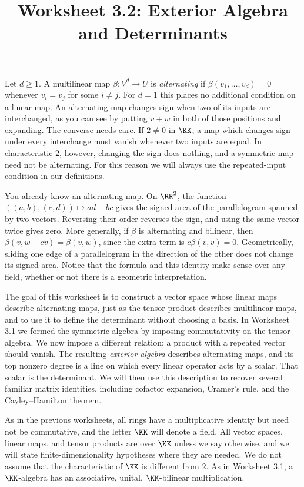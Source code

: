 \documentclass[12pt,reqno]{amsart}
\title{Worksheet 3.2: Exterior Algebra and Determinants}
\begin{document}
\maketitle
\thispagestyle{firstpage}

Let $d\geq1$. A multilinear map $\beta:V^d\to U$ is \emph{alternating} if $\beta(v_1,\ldots,v_d)=0$ whenever $v_i=v_j$ for some $i\ne j$. For $d=1$ this places no additional condition on a linear map. An alternating map changes sign when two of its inputs are interchanged, as you can see by putting $v+w$ in both of those positions and expanding. The converse needs care. If $2\ne0$ in $\KK$, a map which changes sign under every interchange must vanish whenever two inputs are equal. In characteristic $2$, however, changing the sign does nothing, and a symmetric map need not be alternating. For this reason we will always use the repeated-input condition in our definitions.

You already know an alternating map. On $\RR^2$, the function $((a,b),(c,d))\mapsto ad-bc$ gives the signed area of the parallelogram spanned by two vectors. Reversing their order reverses the sign, and using the same vector twice gives zero. More generally, if $\beta$ is alternating and bilinear, then $\beta(v,w+cv)=\beta(v,w)$, since the extra term is $c\beta(v,v)=0$. Geometrically, sliding one edge of a parallelogram in the direction of the other does not change its signed area. Notice that the formula and this identity make sense over any field, whether or not there is a geometric interpretation.

The goal of this worksheet is to construct a vector space whose linear maps describe alternating maps, just as the tensor product describes multilinear maps, and to use it to define the determinant without choosing a basis. In Worksheet 3.1 we formed the symmetric algebra by imposing commutativity on the tensor algebra. We now impose a different relation: a product with a repeated vector should vanish. The resulting \emph{exterior algebra} describes alternating maps, and its top nonzero degree is a line on which every linear operator acts by a scalar. That scalar is the determinant. We will then use this description to recover several familiar matrix identities, including cofactor expansion, Cramer's rule, and the Cayley--Hamilton theorem.

As in the previous worksheets, all rings have a multiplicative identity but need not be commutative, and the letter $\KK$ will denote a field. All vector spaces, linear maps, and tensor products are over $\KK$ unless we say otherwise, and we will state finite-dimensionality hypotheses where they are needed. We do not assume that the characteristic of $\KK$ is different from $2$. As in Worksheet 3.1, a $\KK$-algebra has an associative, unital, $\KK$-bilinear multiplication.
\end{document}
